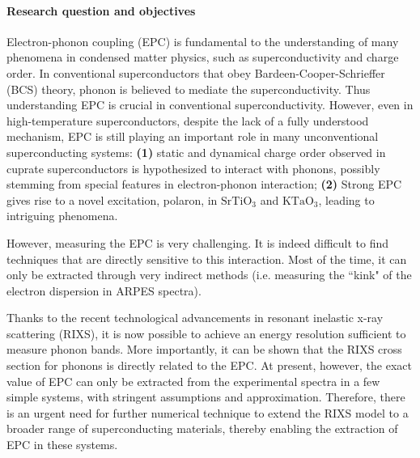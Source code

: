 \documentclass[11pt]{article}
\begin{document}
\paragraph{Research question and objectives}
Electron-phonon coupling (EPC) is fundamental to the understanding of many phenomena in condensed matter physics, such as superconductivity\cite{bardeen_theory_1957,cuk_review_2005} and charge order\cite{arpaia_charge_2021,comin_resonant_2016,tranquada_spins_2013}.
In conventional superconductors that obey Bardeen-Cooper-Schrieffer (BCS) theory, phonon is believed to mediate the superconductivity\cite{bardeen_theory_1957}. 
Thus understanding EPC is crucial in conventional superconductivity. 
However, even in high-temperature superconductors, despite the lack of a fully understood mechanism, EPC is still playing an important role in many unconventional superconducting systems: \textbf{(1)} static and dynamical charge order observed in cuprate superconductors is hypothesized to interact with phonons, possibly stemming from special features in electron-phonon interaction\cite{lin_strongly_2020, wang_charge_2021, huang_quantum_2021, miao_incommensurate_2018,tacon_inelastic_2014,li_multiorbital_2020,li_multiorbital_2020,chaix_dispersive_2017,braicovich_determining_2020,huang_quantum_2021}; 
\textbf{(2)} Strong EPC gives rise to a novel excitation, polaron, in $\mathrm{SrTiO_3}$ and $\mathrm{KTaO_3}$, leading to intriguing phenomena\cite{swartz_polaronic_2018,chen_orientation-dependent_2023}. 

However, measuring the EPC is very challenging. 
It is indeed difficult to find techniques that are directly sensitive to this interaction. Most of the time, it can only be extracted through very indirect methods (i.e. measuring the ``kink" of the electron dispersion in ARPES spectra).

Thanks to the recent technological advancements in resonant inelastic x-ray scattering (RIXS), it is now possible to achieve an energy resolution sufficient to measure phonon bands. 
More importantly, it can be shown that the RIXS cross section for phonons is directly related to the EPC\cite{ament_determining_2011, devereaux_directly_2016}. 
At present, however, the exact value of EPC can only be extracted from the experimental spectra in a few simple systems, with stringent assumptions and approximation\cite{braicovich_determining_2020,vale_high-resolution_2019}. 
Therefore, there is an urgent need for further numerical technique to extend the RIXS model to a broader range of superconducting materials, thereby enabling the extraction of EPC in these systems. 
\end{document}
